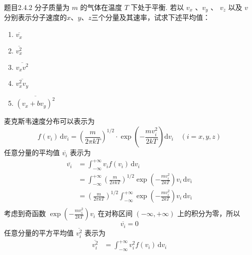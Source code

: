 \begin{question}{题目2.4.2}
    分子质量为 $m$ 的气体在温度 $T$ 下处于平衡. 若以 $v_x$ 、$v_y$ 、 $v_z$ 以及 $v$ 分别表示分子速度的$x$、$y$、$z$三个分量及其速率，试求下述平均值：
    \begin{enumerate}
        \item[(1)] $\overline{v_x}$
        \item[(2)] $\overline{v_x^2}$
        \item[(3)] $\overline{v_xv^2}$
        \item[(4)] $\overline{v_x^2v_y}$
        \item[(5)] $\overline{(v_x+bv_y)^2}$
    \end{enumerate}
\end{question}
\begin{solution}
    麦克斯韦速度分布可以表示为
    \begin{equation}
        f(v_i) \,\mathrm{d}v_i = \left(\frac{m}{2\pi kT}\right)^{1/2} \cdot \exp\left(- \frac{mv_i^2}{2kT}\right) \mathrm{d}v_i
        \quad
        (i = x, y, z)
    \end{equation}
    任意分量的平均值 $\overline{v_i}$ 表示为
    \begin{equation}
        \begin{aligned}
            \overline{v_i}
             & = \int_{-\infty}^{+\infty} v_if(v_i) \,\mathrm{d}v_i                                                                    \\
             & =\int_{-\infty}^{+\infty} \left(\frac{m}{2\pi kT}\right)^{1/2} \exp\left(-\frac{mv_i^2}{2kT}\right) v_i \,\mathrm{d}v_i \\
             & =\left(\frac{m}{2\pi kT}\right)^{1/2} \int_{-\infty}^{+\infty} \exp\left(-\frac{mv_i^2}{2kT}\right) v_i \,\mathrm{d}v_i \\
        \end{aligned}
    \end{equation}
    考虑到奇函数 $\displaystyle \exp\left(-\frac{mv_i^2}{2kT} \right) v_i$ 在对称区间 $(-\infty, +\infty)$ 上的积分为零，所以
    \begin{equation}\label{麦克斯韦速度分布的平均值}
        \overline{v_i} = 0
    \end{equation}
    任意分量的平方平均值 $\overline{v_i^2}$ 表示为
    \begin{equation}
        \begin{aligned}
            \overline{v_i^2}
             & = \int_{-\infty}^{+\infty} v_i^2 f(v_i) \,\mathrm{d}v_i                                                                    \\

\end{aligned}
\end{equation}
\end{solution}
